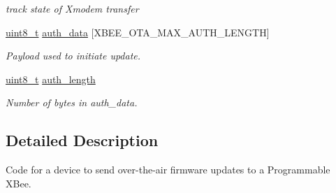 \begin{DoxyCompactItemize}
\begin{DoxyCompactList}\small\item\em track state of Xmodem transfer \end{DoxyCompactList}\item 
\hypertarget{group__xbee__ota__client_ga93137186f6fec6ed6ba4db70db04ca1f}{\hyperlink{group__hal_gae1affc9ca37cfb624959c866a73f83c2}{uint8\-\_\-t} \hyperlink{group__xbee__ota__client_ga93137186f6fec6ed6ba4db70db04ca1f}{auth\-\_\-data} \mbox{[}X\-B\-E\-E\-\_\-\-O\-T\-A\-\_\-\-M\-A\-X\-\_\-\-A\-U\-T\-H\-\_\-\-L\-E\-N\-G\-T\-H\mbox{]}}\label{group__xbee__ota__client_ga93137186f6fec6ed6ba4db70db04ca1f}

\begin{DoxyCompactList}\small\item\em Payload used to initiate update. \end{DoxyCompactList}\item 
\hypertarget{group__xbee__ota__client_ga67b236f1ec1fbada8e400218c6e5c1f7}{\hyperlink{group__hal_gae1affc9ca37cfb624959c866a73f83c2}{uint8\-\_\-t} \hyperlink{group__xbee__ota__client_ga67b236f1ec1fbada8e400218c6e5c1f7}{auth\-\_\-length}}\label{group__xbee__ota__client_ga67b236f1ec1fbada8e400218c6e5c1f7}

\begin{DoxyCompactList}\small\item\em Number of bytes in {\ttfamily auth\-\_\-data}. \end{DoxyCompactList}\end{DoxyCompactItemize}


\subsection{Detailed Description}
Code for a device to send over-\/the-\/air firmware updates to a Programmable X\-Bee. 

